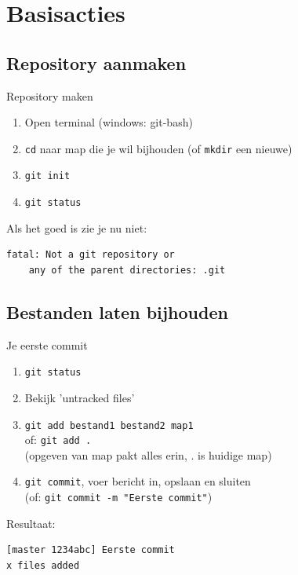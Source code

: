 \section{Basisacties}

\subsection{Repository aanmaken}
\begin{frame}[fragile]{Repository maken}
	\begin{enumerate}
		\item Open terminal (windows: \alert{git-bash})
		\item \texttt{cd} naar map die je wil bijhouden
			(of \texttt{mkdir} een nieuwe)
		\item \texttt{git init}
		\item \texttt{git status}
	\end{enumerate}
	Als het goed is zie je nu \alert{niet}:
	\begin{verbatim}
fatal: Not a git repository or 
	any of the parent directories: .git
	\end{verbatim}
\end{frame}

\subsection{Bestanden laten bijhouden}
\begin{frame}[fragile]{Je eerste commit}
	\begin{enumerate}
		\item \texttt{git status}
		\item Bekijk 'untracked files'
		\item \texttt{git add bestand1 bestand2 map1}\\ of:
			\texttt{git add .}\\
			(opgeven van map pakt alles erin, . is huidige map)
		\item \texttt{git commit}, voer bericht in, opslaan en sluiten\\
			(of: \texttt{git commit -m "Eerste commit"})
	\end{enumerate}
	Resultaat: 
	\begin{verbatim}
[master 1234abc] Eerste commit
x files added
	\end{verbatim}
\end{frame}

